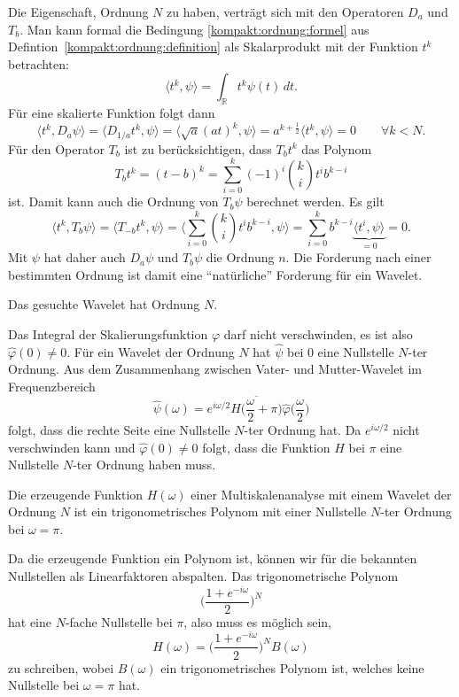 Die Eigenschaft, Ordnung $N$ zu haben, verträgt sich mit den Operatoren
$D_a$ und $T_b$.
Man kann formal die Bedingung \eqref{kompakt:ordnung:formel} aus
Defintion~\ref{kompakt:ordnung:definition} als Skalarprodukt mit der
Funktion $t^k$ betrachten:
\[
\langle t^k,\psi\rangle = \int_{\mathbb{R}} t^k\psi(t)\,dt.
\]
Für eine skalierte Funktion folgt dann
\[
\langle t^k,D_a\psi\rangle 
=
\langle D_{1/a}t^k,\psi\rangle
=
\langle \sqrt{a}(at)^k,\psi\rangle
=
a^{k+\frac12}\langle t^k,\psi\rangle = 0
\qquad
\forall k<N.
\]
Für den Operator $T_b$ ist zu berücksichtigen, dass $T_bt^k$ das
Polynom
\[
T_bt^k
=
(t-b)^k
=
\sum_{i=0}^k (-1)^i \binom{k}{i}t^ib^{k-i}
\]
ist.
Damit kann auch die Ordnung von $T_b\psi$ berechnet werden.
Es gilt
\[
\langle t^k,T_b\psi\rangle
=
\langle T_{-b}t^k,\psi\rangle
=
\biggl\langle \sum_{i=0}^k \binom{k}{i}t^ib^{k-i},\psi\biggr\rangle
=
\sum_{i=0}^k b^{k-i} \underbrace{\langle t^i,\psi\rangle}_{\displaystyle=0}
=
0.
\]
Mit $\psi$ hat daher auch $D_a\psi$ und $T_b\psi$ die Ordnung $n$.
Die Forderung nach einer bestimmten Ordnung ist damit eine ``natürliche''
Forderung für ein Wavelet.

\begin{forderung}
Das gesuchte Wavelet hat Ordnung $N$.
\end{forderung}

Das Integral der Skalierungsfunktion $\varphi$ darf nicht verschwinden,
es ist also $\hat{\varphi}(0)\ne 0$.
Für ein Wavelet der Ordnung $N$ hat $\hat{\psi}$ bei $0$ eine Nullstelle
$N$-ter Ordnung.
Aus dem Zusammenhang zwischen Vater- und Mutter-Wavelet im Frequenzbereich
\[
\hat{\psi}(\omega)
=
e^{i\omega/2}
\overline{H\biggl(\frac{\omega}2+\pi\biggr)}
\hat{\varphi}\biggl(\frac{\omega}2\biggr)
\]
folgt, dass die rechte Seite eine Nullstelle $N$-ter Ordnung hat.
Da $e^{i\omega/2}$ nicht verschwinden kann und $\hat{\varphi}(0)\ne 0$ folgt,
dass die Funktion $H$ bei $\pi$ eine Nullstelle $N$-ter
Ordnung haben muss.

\begin{konsequenz}
Die erzeugende Funktion $H(\omega)$ einer Multiskalenanalyse mit einem
Wavelet der Ordnung $N$ ist ein trigonometrisches Polynom mit einer
Nullstelle $N$-ter Ordnung bei $\omega=\pi$.
\end{konsequenz}

Da die erzeugende Funktion ein Polynom ist, können wir für die
bekannten Nullstellen als Linearfaktoren abspalten.
Das trigonometrische Polynom
\[
\biggl(
\frac{1+e^{-i\omega}}{2}
\biggr)^N
\]
hat eine $N$-fache Nullstelle bei $\pi$, also muss es möglich sein,
\begin{equation}
H(\omega)
= 
\biggl(
\frac{1+e^{-i\omega}}{2}
\biggr)^N B(\omega)
\label{buch:kompakt:HB}
\end{equation}
zu schreiben, wobei $B(\omega)$ ein trigonometrisches Polynom ist,
welches keine Nullstelle bei $\omega=\pi$ hat.

